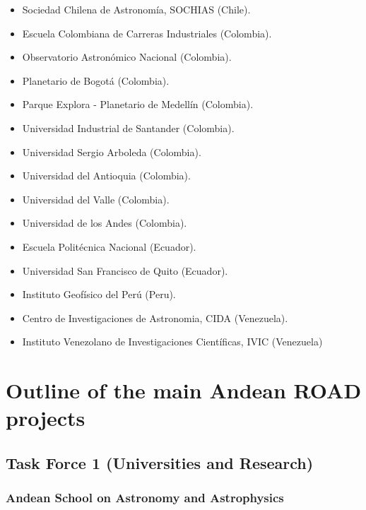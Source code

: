 \documentclass[12pt]{article}
\begin{document}
\begin{itemize}
\item {Sociedad Chilena de Astronom\'ia, SOCHIAS (Chile).}
\item {Escuela Colombiana de Carreras Industriales (Colombia).}
\item {Observatorio Astron\'omico Nacional (Colombia).}
\item {Planetario de Bogot\'a (Colombia).}
\item {Parque Explora - Planetario de Medell\'in (Colombia).}
\item {Universidad Industrial de Santander (Colombia).}
\item {Universidad Sergio Arboleda (Colombia).}
\item {Universidad del Antioquia (Colombia).}
\item {Universidad del Valle (Colombia).}
\item {Universidad de los Andes (Colombia).}
\item {Escuela Polit\'ecnica Nacional (Ecuador).}
\item {Universidad San Francisco de Quito (Ecuador).}
\item {Instituto Geof\'isico del Per\'u (Peru).}
\item {Centro de Investigaciones de Astronomia, CIDA (Venezuela).}
\item {Instituto Venezolano de Investigaciones Cient\'ificas, IVIC (Venezuela)}
\end{itemize}




\section{Outline of the main Andean ROAD projects}

\subsection{Task Force 1 (Universities and Research)}

\subsubsection{Andean School on Astronomy and Astrophysics}
\end{document}

